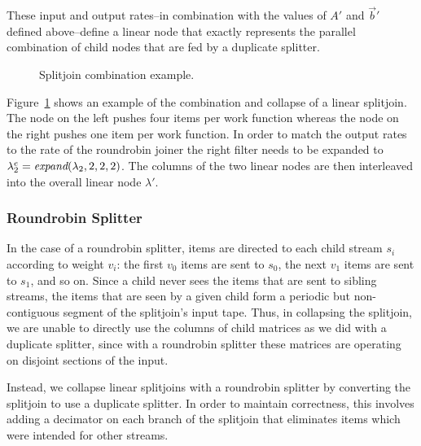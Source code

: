 These input and output rates--in combination with the values of $A'$
and ${\vec b}'$ defined above--define a linear node that exactly represents
the parallel combination of child nodes that are fed by a duplicate
splitter.

\begin{figure}[t]
\center
\epsfxsize=2.8in
\caption{Splitjoin combination example.}
\protect\label{fig:example-splitjoin-combination}
\vspace{-12pt}
\end{figure}

Figure~\ref{fig:example-splitjoin-combination} shows an example of
the combination and collapse of a linear splitjoin. 
The node on the left pushes four items per work function 
whereas the node on the right pushes one item per work function. In order
to match the output rates to the rate of the roundrobin joiner
the right filter needs to be expanded to 
$\lambda_2^e=\mbox{\it expand}(\lambda_2,2,2,2)$. The columns of the
two linear nodes are then interleaved into the overall
linear node $\lambda'$.


\subsubsection{Roundrobin Splitter}

In the case of a roundrobin splitter, items are directed to each child
stream $s_i$ according to weight $v_i$: the first $v_0$ items are sent
to $s_0$, the next $v_1$ items are sent to $s_1$, and so on.  Since a
child never sees the items that are sent to sibling streams, the items
that are seen by a given child form a periodic but non-contiguous
segment of the splitjoin's input tape.  Thus, in collapsing the
splitjoin, we are unable to directly use the columns of child matrices
as we did with a duplicate splitter, since with a roundrobin splitter
these matrices are operating on disjoint sections of the input.

Instead, we collapse linear splitjoins with a roundrobin splitter by
converting the splitjoin to use a duplicate splitter.  In order to
maintain correctness, this involves adding a decimator on each branch
of the splitjoin that eliminates items which were intended for other
streams.

